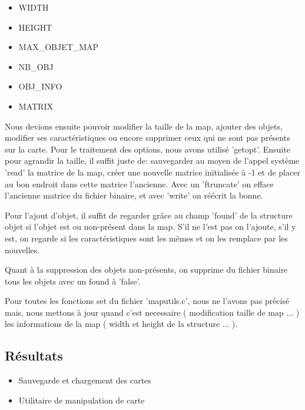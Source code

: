 \documentclass[a4paper]{article}
\newcommand{\cmark}{\ding{51}}%
\newcommand{\xmark}{\ding{55}}%
\newcommand{\done}{\rlap{$\square$}{\raisebox{2pt}{\large\hspace{1pt}\cmark}}%
\hspace{-2.5pt}}
\newcommand{\wontfix}{\rlap{$\square$}{\large\hspace{1pt}\xmark}}
\begin{document}
\begin{itemize}
\item WIDTH
\item HEIGHT
\item MAX\_OBJET\_MAP
\item NB\_OBJ
\item OBJ\_INFO
\item MATRIX
\end{itemize}

Nous devions ensuite pouvoir modifier la taille de la map, ajouter des objets, modifier ses caractéristiques ou encore supprimer ceux qui ne sont pas présents sur la carte.
Pour le traitement des options, nous avons utilisé 'getopt'. Ensuite pour agrandir la taille, il suffit juste de: sauvegarder au moyen de l'appel système 'read' la matrice de la map, créer une nouvelle matrice initialisée à -1 et de placer au bon endroit dans cette matrice l'ancienne. Avec un 'ftruncate' on efface l'ancienne matrice du fichier binaire, et avec 'write' on réécrit la bonne.

Pour l'ajout d'objet, il suffit de regarder grâce au champ 'found' de la structure objet si l'objet est ou non-présent dans la map. S'il ne l'est pas on l'ajoute, s'il y est, on regarde si les caractéristiques sont les mêmes et on les remplace par les nouvelles.

Quant à la suppression des objets non-présents, on supprime du fichier binaire tous les objets avec un found à 'false'.

Pour toutes les fonctions set du fichier 'maputils.c', nous ne l'avons pas précisé mais, nous mettons à jour quand c'est necessaire ( modification taille de map ... ) les informations de la map ( width et height de la structure ... ).

\subsection{Résultats}
\begin{itemize}
  \item Sauvegarde et chargement des cartes
  
  \item Utilitaire de manipulation de carte
\end{itemize}
\end{document}
